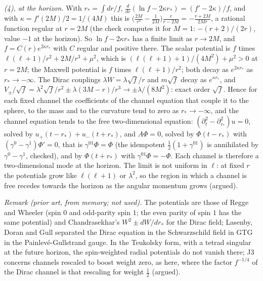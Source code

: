 \emph{(4), at the horizon.} With $r_{*} = \int dr/f$, $\tfrac{d}{dr}(\ln f - 2\kappa r_{*}) = (f' - 2\kappa)/f$, and with $\kappa = f'(2M)/2 = 1/(4M)$ this is $\bigl(\tfrac{2M}{r^{2}} - \tfrac{1}{2M}\bigr)\tfrac{r}{r - 2M} = -\tfrac{r + 2M}{2Mr}$, a rational function regular at $r = 2M$ (the check computes it for $M = 1$: $-(r+2)/(2r)$, value $-1$ at the horizon). So $\ln f - 2\kappa r_{*}$ has a finite limit as $r \to 2M$, and $f = C(r)e^{2\kappa r_{*}}$ with $C$ regular and positive there. The scalar potential is $f$ times $\ell(\ell+1)/r^{2} + 2M/r^{3} + \mu^{2}$, which is $(\ell(\ell+1) + 1)/(4M^{2}) + \mu^{2} > 0$ at $r = 2M$; the Maxwell potential is $f$ times $\ell(\ell+1)/r^{2}$; both decay as $e^{2\kappa r_{*}}$ as $r_{*} \to -\infty$. The Dirac couplings $\lambda W = \lambda\sqrt f/r$ and $m\sqrt f$ decay as $e^{\kappa r_{*}}$, and $V_{\pm}/\sqrt f = \lambda^{2}\sqrt f/r^{2} \pm \lambda(3M - r)/r^{3} \to \pm\lambda/(8M^{2})$: exact order $\sqrt f$. Hence for each fixed channel the coefficients of the channel equation that couple it to the sphere, to the mass and to the curvature tend to zero as $r_{*} \to -\infty$, and the channel equation tends to the free two-dimensional equation: $(\partial_{t}^{2} - \partial_{r_{*}}^{2})u = 0$, solved by $u_{+}(t - r_{*}) + u_{-}(t + r_{*})$, and $A\Phi = 0$, solved by $\Phi(t - r_{*})$ with $(\gamma^{0} - \gamma^{1})\Phi' = 0$, that is $\gamma^{01}\Phi = \Phi$ (the idempotent $\tfrac12(1 + \gamma^{01})$ is annihilated by $\gamma^{0} - \gamma^{1}$, checked), and by $\Phi(t + r_{*})$ with $\gamma^{01}\Phi = -\Phi$. Each channel is therefore a two-dimensional mode at the horizon. The limit is not uniform in $\ell$: at fixed $r$ the potentials grow like $\ell(\ell+1)$ or $\lambda^{2}$, so the region in which a channel is free recedes towards the horizon as the angular momentum grows (argued).

\emph{Remark (prior art, from memory; not used).} The potentials are those of Regge and Wheeler (spin $0$ and odd-parity spin $1$; the even parity of spin $1$ has the same potential) and Chandrasekhar's $W^{2} \pm dW/dr_{*}$ for the Dirac field; Lasenby, Doran and Gull separated the Dirac equation in the Schwarzschild field in GTG in the Painlev\'e-Gullstrand gauge. In the Teukolsky form, with a tetrad singular at the future horizon, the spin-weighted radial potentials do not vanish there; J3 concerns channels rescaled to boost weight zero, as here, where the factor $f^{-1/4}$ of the Dirac channel is that rescaling for weight $\tfrac12$ (argued).
